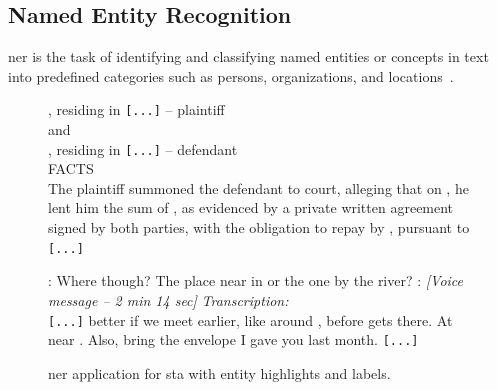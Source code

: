 \subsection{Named Entity Recognition}
\label{sec:rw:ner}
\begin{definition}
    \Acf{ner} is the task of identifying and classifying named entities or concepts in text into predefined categories such as persons, organizations, and locations~\cite{entityorientedsearch2018balog,keraghel2024recentadvancesnamedentity,jm3}.
\end{definition}

\begin{figure}[htbp]
\centering
\begin{minipage}[t]{0.48\linewidth}
\small
{}, residing in  \texttt{[...]} -- plaintiff\\
and\\
, residing in  \texttt{[...]} -- defendant\\
FACTS\\
The plaintiff summoned the defendant to court, alleging that on , he lent him the sum of , as evidenced by a private written agreement signed by both parties, with the obligation to repay by , pursuant to  \texttt{[...]}
\label{fig:extract-ner-judgment}
\end{minipage}
\hfill
\begin{minipage}[t]{0.48\linewidth}
\small
\DATE{[2025-07-28 -- 14:15]} : Where though? The place near  in  or the one by the river?
\DATE{[2025-07-29 -- 08:45]} : \textit{[Voice message -- 2 min 14 sec]}
\quad \textit{Transcription:}\\
\quad \texttt{[...]} better if we meet earlier, like around , before  gets there. At  near . Also, bring the envelope I gave you last month.  \texttt{[...]}\\
\label{fig:extract-ner-chat}
\end{minipage}
\caption{\Ac{ner} application for \acl{sta} with entity highlights and labels.}
\label{fig:extracts-ner}
\end{figure}

